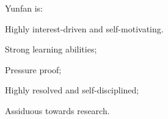 
\begin{cventries}

  \cventry
    {Yunfan is:} %
    {} %
    {} %
    {} %
    {
      \begin{cvitems} %
        \item {Highly interest-driven and self-motivating.}
        \item {Strong learning abilities;}
        \item {Pressure proof;}
        \item {Highly resolved and self-disciplined;}
        \item {Assiduous towards research.}
      \end{cvitems}
    }

\end{cventries}

